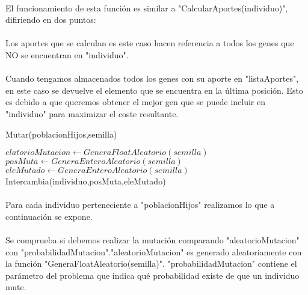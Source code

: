 	\paragraph{}El funcionamiento de esta función es similar a "CalcularAportes(individuo)", difiriendo en dos puntos:
	
	\paragraph{}Los aportes que se calculan es este caso hacen referencia a todos los genes que NO se encuentran en "individuo".
	
	\paragraph{}Cuando tengamos almacenados todos los genes con su aporte en "listaAportes", en este caso se devuelve el elemento que se encuentra en la última posición. Esto es debido a que queremos obtener el mejor gen que se puede incluir en "individuo" para maximizar el coste resultante.

	\begin{algorithm}[H]
		\caption{Mutar(poblacionHijos,semilla)}
		\begin{algorithmic}
			\STATE $elatorioMutacion\leftarrow GeneraFloatAleatorio(semilla)$
			\STATE $posMuta \leftarrow GeneraEnteroAleatorio(semilla)$
			\STATE $eleMutado \leftarrow GeneraEnteroAleatorio(semilla)$
			\STATE Intercambia(individuo,posMuta,eleMutado)
			\ENDIF
			\ENDFOR
		\end{algorithmic}
	\end{algorithm}

	\paragraph{}Para cada individuo perteneciente a "poblacionHijos" realizamos lo que a continuación se expone.
	
	\paragraph{}Se comprueba si debemos realizar la mutación comparando "aleatorioMutacion" con "probabilidadMutacion"."aleatorioMutacion" es generado aleatoriamente con la función "GeneraFloatAleatorio(semilla)". "probabilidadMutacion" contiene el parámetro del problema que indica qué probabilidad existe de que un individuo mute.
	
